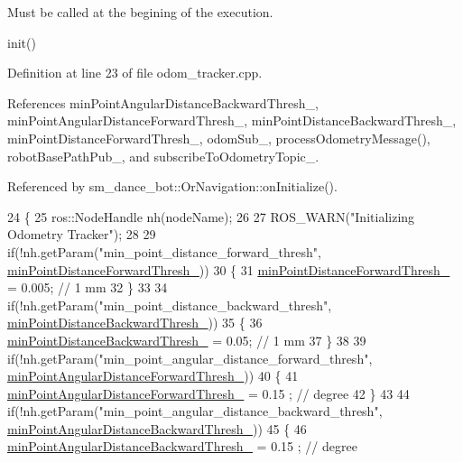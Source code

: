 Must be called at the begining of the execution. 

init() 

Definition at line 23 of file odom\+\_\+tracker.\+cpp.



References min\+Point\+Angular\+Distance\+Backward\+Thresh\+\_\+, min\+Point\+Angular\+Distance\+Forward\+Thresh\+\_\+, min\+Point\+Distance\+Backward\+Thresh\+\_\+, min\+Point\+Distance\+Forward\+Thresh\+\_\+, odom\+Sub\+\_\+, process\+Odometry\+Message(), robot\+Base\+Path\+Pub\+\_\+, and subscribe\+To\+Odometry\+Topic\+\_\+.



Referenced by sm\+\_\+dance\+\_\+bot\+::\+Or\+Navigation\+::on\+Initialize().


\begin{DoxyCode}
24 \{
25     ros::NodeHandle nh(nodeName);
26 
27     ROS\_WARN(\textcolor{stringliteral}{"Initializing Odometry Tracker"});
28 
29     \textcolor{keywordflow}{if}(!nh.getParam(\textcolor{stringliteral}{"min\_point\_distance\_forward\_thresh"},
      \hyperlink{classodom__tracker_1_1OdomTracker_adda207eec9e5a5999e1e97e6f2876377}{minPointDistanceForwardThresh\_}))
30     \{
31         \hyperlink{classodom__tracker_1_1OdomTracker_adda207eec9e5a5999e1e97e6f2876377}{minPointDistanceForwardThresh\_} = 0.005; \textcolor{comment}{// 1 mm}
32     \}
33 
34     \textcolor{keywordflow}{if}(!nh.getParam(\textcolor{stringliteral}{"min\_point\_distance\_backward\_thresh"},
      \hyperlink{classodom__tracker_1_1OdomTracker_ae168f975b648874e7f00c2431683b3b1}{minPointDistanceBackwardThresh\_}))
35     \{
36         \hyperlink{classodom__tracker_1_1OdomTracker_ae168f975b648874e7f00c2431683b3b1}{minPointDistanceBackwardThresh\_} = 0.05; \textcolor{comment}{// 1 mm}
37     \}
38 
39     \textcolor{keywordflow}{if}(!nh.getParam(\textcolor{stringliteral}{"min\_point\_angular\_distance\_forward\_thresh"},
      \hyperlink{classodom__tracker_1_1OdomTracker_acd2883047a61afe3f574af0995ef7a09}{minPointAngularDistanceForwardThresh\_}))
40     \{
41         \hyperlink{classodom__tracker_1_1OdomTracker_acd2883047a61afe3f574af0995ef7a09}{minPointAngularDistanceForwardThresh\_} = 0.15 ; \textcolor{comment}{// degree}
42     \}
43 
44     \textcolor{keywordflow}{if}(!nh.getParam(\textcolor{stringliteral}{"min\_point\_angular\_distance\_backward\_thresh"},
      \hyperlink{classodom__tracker_1_1OdomTracker_a6b9214dccdd97870e2baf8ab51d47727}{minPointAngularDistanceBackwardThresh\_}))
45     \{
46         \hyperlink{classodom__tracker_1_1OdomTracker_a6b9214dccdd97870e2baf8ab51d47727}{minPointAngularDistanceBackwardThresh\_} = 0.15 ; \textcolor{comment}{// degree}

\end{DoxyCode}
